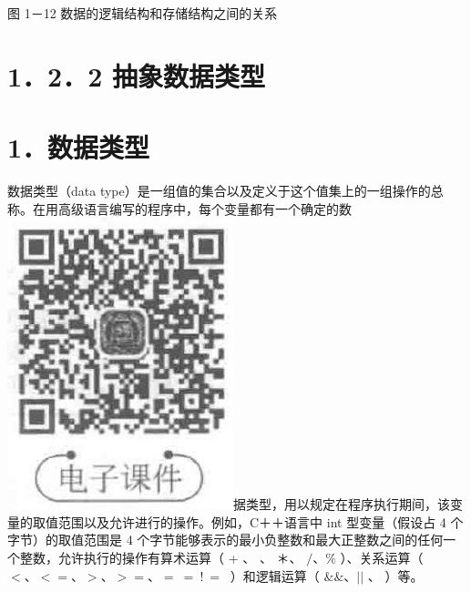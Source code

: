 \documentclass[10pt]{article}
\begin{document}
图 1－12 数据的逻辑结构和存储结构之间的关系

\section*{1．2．2 抽象数据类型}
\section*{1．数据类型}
数据类型（data type）是一组值的集合以及定义于这个值集上的一组操作的总称。在用高级语言编写的程序中，每个变量都有一个确定的数\\
\includegraphics[max width=\textwidth]{2025_06_06_704745ea57b15b2333e5g-024(1)}据类型，用以规定在程序执行期间，该变量的取值范围以及允许进行的操作。例如，C＋＋语言中 int 型变量（假设占 4 个字节）的取值范围是 4 个字节能够表示的最小负整数和最大正整数之间的任何一个整数，允许执行的操作有算术运算（ + 、 、 ＊、 $/ 、 \%$ ）、关系运算（ $<、<=、>、>=、=~=~!~=~$ ）和逻辑运算（ $\& \& 、|\mid$ 、 ）等。
\end{document}
